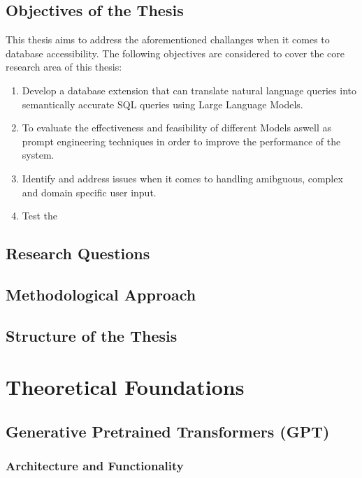 \documentclass{article}
\begin{document}
\subsection{Objectives of the Thesis}

This thesis aims to address the aforementioned challanges when it comes to database accessibility.
The following objectives are considered to cover the core research area of this thesis:

\begin{enumerate}
    \item Develop a database extension that can translate natural language queries into semantically
          accurate SQL queries using Large Language Models.
    \item To evaluate the effectiveness and feasibility of different Models aswell as prompt engineering
          techniques in order to improve the performance of the system.
    \item Identify and address issues when it comes to handling amibguous, complex and domain specific user input.
    \item Test the 
\end{enumerate}  



\subsection{Research Questions}
\subsection{Methodological Approach}
\subsection{Structure of the Thesis}

\newpage

\section{Theoretical Foundations}

\subsection{Generative Pretrained Transformers (GPT)}
\subsubsection{Architecture and Functionality}
\end{document}
